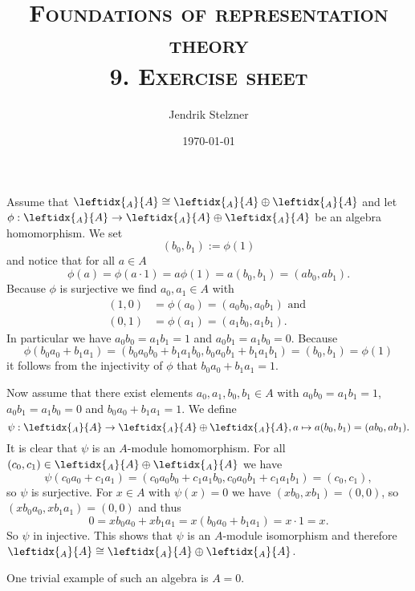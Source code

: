 \documentclass[a4paper,10pt]{article}
\title{\textsc{Foundations of representation theory \\ \Large 9. Exercise sheet}}
\author{Jendrik Stelzner}
\date{\today}
\theoremstyle{definition}
\newcommand{\li}[2]{\leftidx{_{#1}}{#2}}
\begin{document}
\maketitle





\section{}
Assume that $\li{A}{A} \cong \li{A}{A} \oplus \li{A}{A}$ and let $\phi : \li{A}{A} \rightarrow \li{A}{A} \oplus \li{A}{A}$ be an algebra homomorphism. We set
\[
 (b_0, b_1) := \phi(1)
\]
and notice that for all $a \in A$
\[
 \phi(a) = \phi(a \cdot 1) = a \phi(1) = a(b_0, b_1) = (ab_0, ab_1).
\]
Because $\phi$ is surjective we find $a_0, a_1 \in A$ with
\begin{align*}
 (1,0) &= \phi(a_0) = (a_0 b_0, a_0 b_1) \text{ and } \\
 (0,1) &= \phi(a_1) = (a_1 b_0, a_1 b_1).
\end{align*}
In particular we have $a_0 b_0 = a_1 b_1 = 1$ and $a_0 b_1 = a_1 b_0 = 0$. Because
\[
 \phi(b_0 a_0 + b_1 a _1)
 = (b_0 a_0 b_0 + b_1 a_1 b_0, b_0 a_0 b_1 + b_1 a_1 b_1)
 = (b_0, b_1)
 = \phi(1)
\]
it follows from the injectivity of $\phi$ that $b_0 a_0 + b_1 a_1 = 1$.

Now assume that there exist elements $a_0, a_1, b_0, b_1 \in A$ with $a_0 b_0 = a_1 b_1 = 1$, $a_0 b_1 = a_1 b_0 = 0$ and $b_0 a_0 + b_1 a_1 = 1$. We define
\[
 \psi : \li{A}{A} \rightarrow \li{A}{A} \oplus \li{A}{A}, a \mapsto a(b_0, b_1) = (ab_0, ab_1).
\]
It is clear that $\psi$ is an $A$-module homomorphism. For all $(c_0, c_1) \in \li{A}{A} \oplus \li{A}{A}$ we have
\[
 \psi(c_0 a_0 + c_1 a_1)
 = (c_0 a_0 b_0 + c_1 a_1 b_0, c_0 a_0 b_1 + c_1 a_1 b_1)
 = (c_0, c_1),
\]
so $\psi$ is surjective. For $x \in A$ with $\psi(x) = 0$ we have $(x b_0, x b_1) = (0,0)$, so $(x b_0 a_0, x b_1 a_1) = (0,0)$ and thus
\[
 0 = x b_0 a_0 + x b_1 a_1 = x (b_0 a_0 + b_1 a_1) = x \cdot 1 = x.
\]
So $\psi$ in injective. This shows that $\psi$ is an $A$-module isomorphism and therefore $\li{A}{A} \cong \li{A}{A} \oplus \li{A}{A}$.

One trivial example of such an algebra is $A = 0$.
\end{document}
